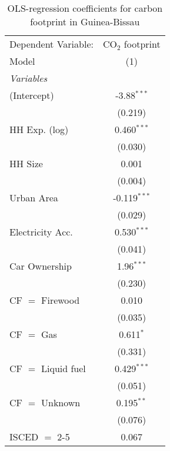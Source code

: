 
\begin{table}[htbp!]
   \centering
   \small
   \begin{adjustbox}{width = 1\textwidth, max height = 0.95\textheight, center}
      \begin{threeparttable}[b]
         \caption{\label{tab:OLS_2_GNB} OLS-regression coefficients for carbon footprint in Guinea-Bissau}
         \begin{tabular}{lc}
            \tabularnewline \midrule \midrule
            Dependent Variable: & CO$_{2}$ footprint\\  
            Model               & (1)\\  
            \midrule
            \emph{Variables}\\
            (Intercept)         & -3.88$^{***}$\\   
                                & (0.219)\\   
            HH Exp. (log)       & 0.460$^{***}$\\   
                                & (0.030)\\   
            HH Size             & 0.001\\   
                                & (0.004)\\   
            Urban Area          & -0.119$^{***}$\\   
                                & (0.029)\\   
            Electricity Acc.    & 0.530$^{***}$\\   
                                & (0.041)\\   
            Car Ownership       & 1.96$^{***}$\\   
                                & (0.230)\\   
            CF $=$ Firewood     & 0.010\\   
                                & (0.035)\\   
            CF $=$ Gas          & 0.611$^{*}$\\   
                                & (0.331)\\   
            CF $=$ Liquid fuel  & 0.429$^{***}$\\   
                                & (0.051)\\   
            CF $=$ Unknown      & 0.195$^{**}$\\   
                                & (0.076)\\   
            ISCED $=$ 2-5       & 0.067\\   

\end{tabular}
\end{threeparttable}
\end{adjustbox}
\end{table}
